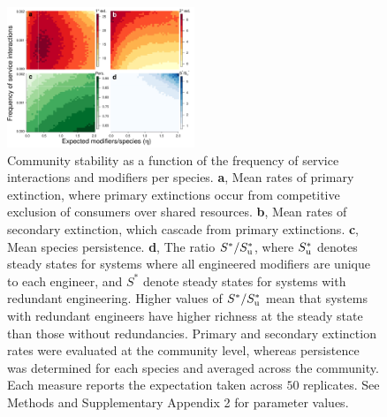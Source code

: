\documentclass[twocolumn,preprintnumbers,amsmath,amssymb,superscriptaddress,linenumbers]{revtex4-1}
\begin{document}
\vspace{0mm}
\begin{figure}[h!]
\centering
\includegraphics[width=0.5\textwidth]{fig_engineers6.pdf}
\vspace{-8mm}
\caption{
Community stability as a function of the frequency of service interactions and modifiers per species.
\textbf{a}, Mean rates of primary extinction, where primary extinctions occur from competitive exclusion of consumers over shared resources.
\textbf{b}, Mean rates of secondary extinction, which cascade from primary extinctions.
\textbf{c}, Mean species persistence.
\textbf{d}, The ratio $S^*/S^*_{\rm u}$, where $S^*_{\rm u}$ denotes steady states for systems where all engineered modifiers are unique to each engineer, and $S^*$ denote steady states for systems with redundant engineering. Higher values of $S^*/S^*_{\rm u}$ mean that systems with redundant engineers have higher richness at the steady state than those without redundancies.
Primary and secondary extinction rates were evaluated at the community level, whereas persistence was determined for each species and averaged across the community.
Each measure reports the expectation taken across $50$ replicates.
See Methods and Supplementary Appendix 2 for parameter values.
\vspace{0mm}
}
\label{fig:engineers}
\end{figure}
\end{document}
